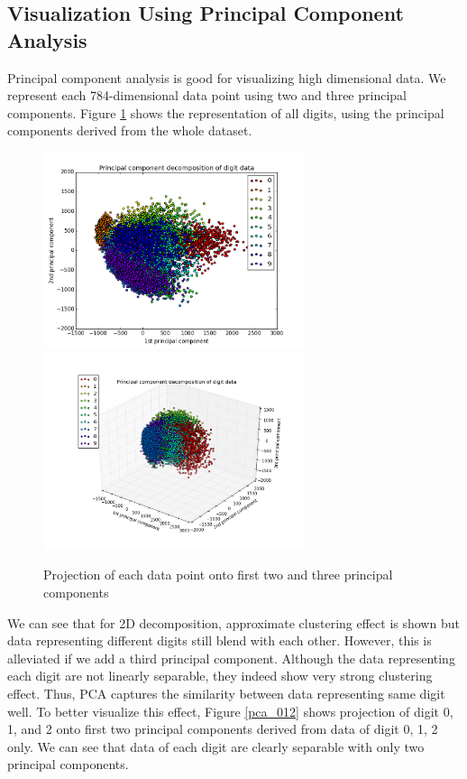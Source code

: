 \documentclass[11pt]{article}
\begin{document}
\subsection*{Visualization Using Principal Component Analysis}
Principal component analysis is good for visualizing high dimensional data. We represent each 784-dimensional data point using two and three principal components. Figure \ref{pca_all} shows the representation of all digits, using the principal components derived from the whole dataset.
\begin{figure}[H]
\begin{center}
\includegraphics[width=3in]{pca_all.png}\\
\includegraphics[width=3in]{pca_all_3d.png}
\caption{Projection of each data point onto first two and three principal components}
\label{pca_all}
\end{center}
\end{figure}
We can see that for 2D decomposition, approximate clustering effect is shown but data representing different digits still blend with each other. However, this is alleviated if we add a third principal component. Although the data representing each digit are not linearly separable, they indeed show very strong clustering effect. Thus, PCA captures the similarity between data representing same digit well. To better visualize this effect, Figure \ref{pca_012} shows projection of digit 0, 1, and 2 onto first two principal components derived from data of digit 0, 1, 2 only. We can see that data of each digit are clearly separable with only two principal components.
\end{document}
